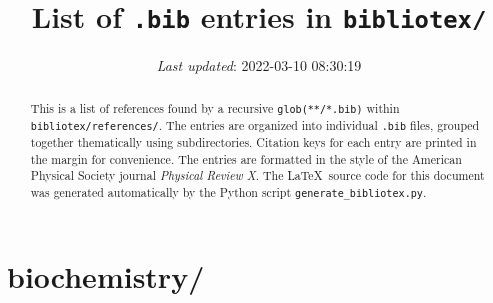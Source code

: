 \documentclass[letterpaper, 10pt, oneside, openany]{report}
\title{List of \texttt{.bib} entries in \texttt{bibliotex/}}
\date{\textit{Last updated}: 2022-03-10 08:30:19}
\begin{document}
\maketitle

\begin{abstract}
	This is a list of references found by a recursive \texttt{glob(**/*.bib)} within \texttt{bibliotex/references/}.
	The entries are organized into individual \texttt{.bib} files, grouped together thematically using subdirectories.
	Citation keys for each entry are printed in the margin for convenience.
	The entries are formatted in the style of the American Physical Society journal \emph{Physical Review X}.
	The \LaTeX\ source code for this document was generated automatically by the Python script \texttt{generate\_bibliotex.py}.
\end{abstract}

\tableofcontents

\chapter*{biochemistry/}

\begin{refsection}
	\nocite{*}
	\printbibliography[title = {Li-ATP.bib}, heading = subbibintoc]
\end{refsection}

\begin{refsection}
	\nocite{*}
	\printbibliography[title = {Mg-ATP.bib}, heading = subbibintoc]
\end{refsection}

\begin{refsection}
	\nocite{*}
	\printbibliography[title = {Mg-DNA.bib}, heading = subbibintoc]
\end{refsection}

\begin{refsection}
	\nocite{*}
	\printbibliography[title = {Mg-OAc.bib}, heading = subbibintoc]
\end{refsection}

\begin{refsection}
	\nocite{*}
	\printbibliography[title = {Mg.bib}, heading = subbibintoc]
\end{refsection}

\begin{refsection}
	\nocite{*}
	\printbibliography[title = {misc.bib}, heading = subbibintoc]
\end{refsection}
\end{document}
